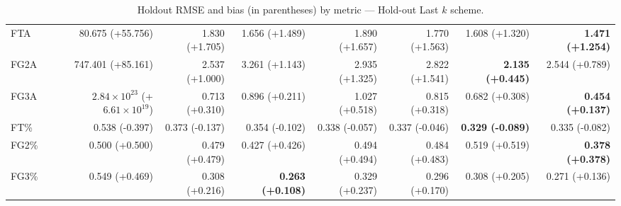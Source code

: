 \documentclass{article}
\begin{document}
\begin{table}[H]
{\begin{tabular}{lrrrrrrr}
FTA & 80.675 (+55.756) & 1.830 (+1.705) & 1.656 (+1.489) & 1.890 (+1.657) & 1.770 (+1.563) & 1.608 (+1.320) & \textbf{1.471 (+1.254)} \\
FG2A & 747.401 (+85.161) & 2.537 (+1.000) & 3.261 (+1.143) & 2.935 (+1.325) & 2.822 (+1.541) & \textbf{2.135 (+0.445)} & 2.544 (+0.789) \\
FG3A & $2.84\times10^{23}$ (+$6.61\times10^{19}$) & 0.713 (+0.310) & 0.896 (+0.211) & 1.027 (+0.518) & 0.815 (+0.318) & 0.682 (+0.308) & \textbf{0.454 (+0.137)} \\
FT\% & 0.538 (-0.397) & 0.373 (-0.137) & 0.354 (-0.102) & 0.338 (-0.057) & 0.337 (-0.046) & \textbf{0.329 (-0.089)} & 0.335 (-0.082) \\
FG2\% & 0.500 (+0.500) & 0.479 (+0.479) & 0.427 (+0.426) & 0.494 (+0.494) & 0.484 (+0.483) & 0.519 (+0.519) & \textbf{0.378 (+0.378)} \\
FG3\% & 0.549 (+0.469) & 0.308 (+0.216) & \textbf{0.263 (+0.108)} & 0.329 (+0.237) & 0.296 (+0.170) & 0.308 (+0.205) & 0.271 (+0.136) \\
\bottomrule
\end{tabular}
}
\caption{Holdout RMSE and bias (in parentheses) by metric — Hold-out Last $k$ scheme.}
\label{tab:coverage_holdout_last_k}
\end{table}
\end{document}
